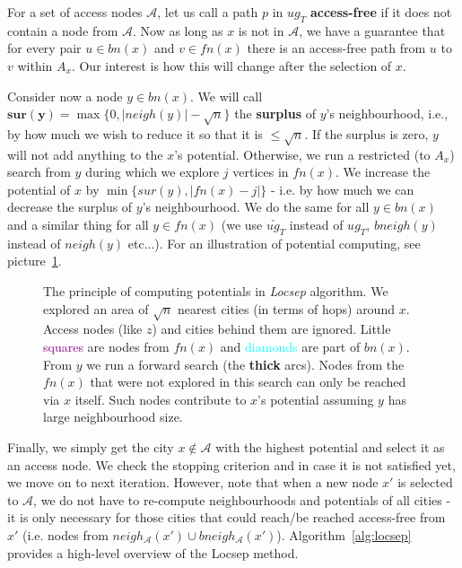 		For a set of access nodes $\mathcal{A}$, let us call a path $p$ in $ug_{T}$ \textbf{access-free} if it does not contain a node from $\mathcal{A}$. Now as long as $x$ is not in $\mathcal{A}$, we have a guarantee that for every pair $u \in bn(x)$ and $v \in fn(x)$ there is an access-free path from $u$ to $v$ within $A_{x}$. Our interest is how this will change after the selection of $x$.
				
		Consider now a node $y \in bn(x)$. We will call $\bm{sur(y)} = \max\{0, |neigh(y)| - \sqrt{n}\}$ the \textbf{surplus} of $y$'s neighbourhood, i.e., by how much we wish to reduce it so that it is $\leq \sqrt{n}$. If the surplus is zero, $y$ will not add anything to the $x$'s potential. Otherwise, we run a restricted (to $A_{x}$) search from $y$ during which we explore $j$ vertices in $fn(x)$. We increase the potential of $x$ by $\min\{sur(y), |fn(x) - j|\}$ - i.e. by how much we can decrease the surplus of $y$'s neighbourhood. We do the same for all $y \in bn(x)$ and a similar thing for all $y \in fn(x)$ (we use $\overleftarrow{ug_{T}}$ instead of $ug_{T}$, $bneigh(y)$ instead of $neigh(y)$ etc...). For an illustration of potential computing, see picture~\ref{fig:locsep}. \\
		
		\begin{figure}[h!]
			\begin{center}
			\end{center}
			\caption{\label{fig:locsep} The principle of computing potentials in \textit{Locsep} algorithm. We explored an area of $\sqrt{n}$ nearest cities (in terms of hops) around $x$. Access nodes (like $z$) and cities behind them are ignored. Little \textcolor{purple}{squares} are nodes from $fn(x)$ and \textcolor{cyan}{diamonds} are part of $bn(x)$. From $y$ we run a forward search (the \textbf{thick} arcs). Nodes from the $fn(x)$ that were not explored in this search can only be reached via $x$ itself. Such nodes contribute to $x$'s potential assuming $y$ has large neighbourhood size.}
		\end{figure}

		\noindent Finally, we simply get the city $x \not \in \mathcal{A}$ with the highest potential and select it as an access node. We check the stopping criterion and in case it is not satisfied yet, we move on to next iteration. However, note that when a new node $x'$ is selected to $\mathcal{A}$, we do not have to re-compute neighbourhoods and potentials of all cities - it is only necessary for those cities that could reach/be reached access-free from $x'$ (i.e. nodes from $neigh_{\mathcal{A}}(x') \cup bneigh_{\mathcal{A}}(x')$). Algorithm~\ref{alg:locsep} provides a high-level overview of the Locsep method. \\
		
